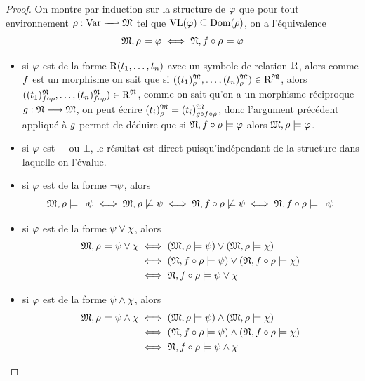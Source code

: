 \begin{proof}
  On montre par induction sur la structure de $\varphi$ que pour tout
  environnement
  $\makeFunNamePartial{\env}{\Var}{\varMM}$ tel que
  $\operatorname{VL}(\varphi) \subseteq\operatorname{Dom}(\rho)$, on a l'équivalence
  \[\mathfrak{M},\rho\models \varphi \iff \mathfrak{N},f\circ \rho\models \varphi\]
  \begin{itemize}
  \item si $\varphi$ est de la forme
    $\mathrm{R}(t_1,\ldots,t_n)$ avec un symbole de relation
    $\mathrm{R}$, alors comme $f$ est un morphisme on sait que si
    $((t_1)^{\mathfrak{M}}_{\rho},\ldots,(t_n)^{\mathfrak{M}}_{\rho})\in \mathrm{R}^{\mathfrak{M}}$, alors
    $((t_1)^{\mathfrak{N}}_{f\circ \rho},\ldots,
    (t_n)^{\mathfrak{N}}_{f\circ\rho})\in \mathrm{R}^{\mathfrak{N}}$,
    comme on sait qu'on a un morphisme réciproque
    $g : \displaystyle \mathfrak{N} \longrightarrow \mathfrak{M}$, on peut
    écrire
    $(t_i)^{\mathfrak{M}}_{\rho}= (t_i)^{\mathfrak{M}}_{g\circ f\circ\rho}$,
    donc l'argument précédent appliqué à $g$ permet de déduire que si
    $\mathfrak{N},f\circ \rho\models \varphi$ alors $\mathfrak{M},\rho\models\varphi$.
  \item si $\varphi$ est $\top$ ou $\bot$,
    le résultat est direct puisqu'indépendant de la structure dans laquelle on
    l'évalue.
  \item si $\varphi$ est de la forme $\lnot \psi$, alors
    \[\mathfrak{M},\rho\models \lnot \psi\iff \mathfrak{M},\rho\not\models\psi
    \iff \mathfrak{N},f\circ\rho\not\models\psi
    \iff \mathfrak{N},f\circ\rho\models\lnot \psi\]
  \item si $\varphi$ est de la forme $\psi\lor \chi$, alors
    \begin{align*}
      \mathfrak{M},\rho\models \psi\lor \chi &\iff (\mathfrak{M},\rho\models\psi)\lor
      (\mathfrak{M},\rho\models\chi) \\
      &\iff (\mathfrak{N},f\circ\rho\models\psi)\lor
      (\mathfrak{N},f\circ\rho\models \chi)\\
      &\iff \mathfrak{N},f\circ\rho\models\psi\lor\chi
      \end{align*}
  \item si $\varphi$ est de la forme $\psi\land \chi$, alors
    \begin{align*}
      \mathfrak{M},\rho\models \psi\land \chi &\iff (\mathfrak{M},\rho\models \psi)\land
      (\mathfrak{M},\rho\models\chi) \\
      &\iff (\mathfrak{N},f\circ\rho\models \psi)\land
      (\mathfrak{N},f\circ\rho\models \chi)\\
      &\iff \mathfrak{N},f\circ\rho\models \psi\land \chi
      \end{align*}

\end{itemize}
\end{proof}
